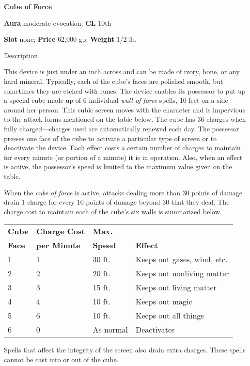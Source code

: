 \textbf{Cube of Force}
				
\textbf{Aura} moderate evocation;\textbf{ CL }10th
				
\textbf{Slot} none; \textbf{Price} 62,000 gp; \textbf{Weight }1/2 lb.
				
Description
				
This device is just under an inch across and can be made of ivory, bone, or any hard mineral. Typically, each of the cube's faces are polished smooth, but sometimes they are etched with runes. The device enables its possessor to put up a special cube made up of 6 individual \textit{wall of force }spells, 10 feet on a side around her person. This cubic screen moves with the character and is impervious to the attack forms mentioned on the table below. The cube has 36 charges when fully charged---charges used are automatically renewed each day. The possessor presses one face of the cube to activate a particular type of screen or to deactivate the device. Each effect costs a certain number of charges to maintain for every minute (or portion of a minute) it is in operation. Also, when an effect is active, the possessor's speed is limited to the maximum value given on the table.
				
When the \textit{cube of force }is active, attacks dealing more than 30 points of damage drain 1 charge for every 10 points of damage beyond 30 that they deal. The charge cost to maintain each of the cube's six walls is summarized below.\\

\begin{tabularx}{\linewidth}{lllX}
\textbf{Cube} & \textbf{Charge Cost} & \textbf{Max.} & \\
\textbf{Face} & \textbf{per Minute} & \textbf{Speed} & \textbf{Effect}\\
1 & 1 & 30 ft. & Keeps out gases, wind, etc.\\
2 & 2 & 20 ft. & Keeps out nonliving matter\\
3 & 3 & 15 ft. & Keeps out living matter\\
4 & 4 & 10 ft. & Keeps out magic\\
5 & 6 & 10 ft. & Keeps out all things\\
6 & 0 & As normal & Deactivates\\
\end{tabularx}
				
Spells that affect the integrity of the screen also drain extra charges. These spells cannot be cast into or out of the cube. \\

